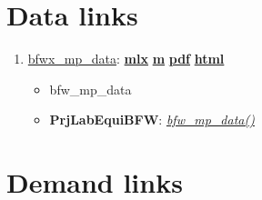 \documentclass[
]{book}
\providecommand{\tightlist}{%
  \setlength{\itemsep}{0pt}\setlength{\parskip}{0pt}}
\begin{document}
\hypertarget{data-links}{%
\section{Data links}\label{data-links}}

\begin{enumerate}
\def\labelenumi{\arabic{enumi}.}
\tightlist
\item
  \href{https://fanwangecon.github.io/PrjLabEquiBFW/PrjLabEquiBFW/doc/data/htmlpdfm/bfwx_mp_data.html}{bfwx\_mp\_data}: \href{https://github.com/FanWangEcon/PrjLabEquiBFW/blob/master/PrjLabEquiBFW/doc/data/bfwx_mp_data.mlx}{\textbf{mlx}} \textbar{} \href{https://github.com/FanWangEcon/PrjLabEquiBFW/blob/master/PrjLabEquiBFW/doc/data/htmlpdfm/bfwx_mp_data.m}{\textbf{m}} \textbar{} \href{https://github.com/FanWangEcon/PrjLabEquiBFW/blob/master/PrjLabEquiBFW/doc/data/htmlpdfm/bfwx_mp_data.pdf}{\textbf{pdf}} \textbar{} \href{https://fanwangecon.github.io/PrjLabEquiBFW/PrjLabEquiBFW/doc/data/htmlpdfm/bfwx_mp_data.html}{\textbf{html}}

  \begin{itemize}
  \tightlist
  \item
    bfw\_mp\_data
  \item
    \textbf{PrjLabEquiBFW}: \emph{\href{https://github.com/FanWangEcon/PrjLabEquiBFW/blob/main/PrjLabEquiBFW/paramsdata/bfw_mp_data.m}{bfw\_mp\_data()}}
  \end{itemize}
\end{enumerate}

\hypertarget{demand-links}{%
\section{Demand links}\label{demand-links}}
\end{document}
